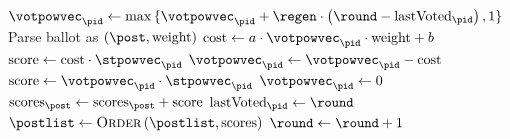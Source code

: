 \begin{algorithm}[H]
  \caption{$\textsc{HandleVote}\left(\mathrm{ballot},
  \player_{\pid}\right)$}
  \label{alg:steem:handlevote}
  \begin{algorithmic}[1]
     
      \State $\votpowvec_{\pid} \gets \max{\lbrace \votpowvec_{\pid} + \regen
      \cdot \left(\round - \mathrm{lastVoted}_{\pid}\right), 1 \rbrace}$
        \State Parse ballot as $\left(\post, \mathrm{weight}\right)$
        \State $\mathrm{cost} \gets a \cdot \votpowvec_{\pid} \cdot
        \mathrm{weight} + b$
          \State $\mathrm{score} \gets \mathrm{cost} \cdot \stpowvec_{\pid}$
          \State $\votpowvec_{\pid} \gets \votpowvec_{\pid} - \mathrm{cost}$
        \Else
          \State $\mathrm{score} \gets \votpowvec_{\pid} \cdot
          \stpowvec_{\pid}$
          \State $\votpowvec_{\pid} \gets 0$
        \EndIf
        \State $\mathrm{scores}_\post \gets \mathrm{scores}_\post +
        \mathrm{score}$
      \EndIf
      \State $\mathrm{lastVoted}_{\pid} \gets \round$
    \EndIf
      \State $\postlist \gets \textsc{Order}\left(\postlist,
      \mathrm{scores}\right)$ 
    \EndIf
      \State $\round \gets \round + 1$
  \end{algorithmic}
\end{algorithm}

